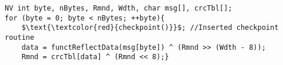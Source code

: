 \documentclass[border={20pt 5pt 35pt 10pt}]{standalone} %
\begin{document}
	

 \begin{lstlisting}[style = mystyle]
NV int byte, nBytes, Rmnd, Wdth, char msg[], crcTbl[];
for (byte = 0; byte < nBytes; ++byte){
	$\text{\textcolor{red}{checkpoint()}}$; //Inserted checkpoint routine
	data = functReflectData(msg[byte]) ^ (Rmnd >> (Wdth - 8));
	Rmnd = crcTbl[data] ^ (Rmnd << 8);}
\end{lstlisting} 
\end{document}
